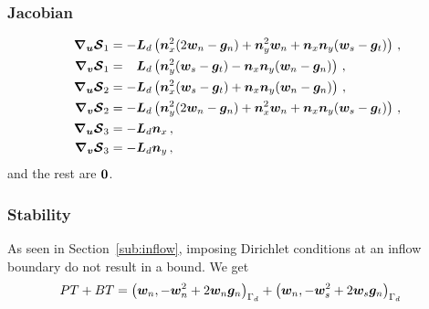 \subsubsection*{Jacobian}
  \begin{equation*}
    \begin{aligned}
      \bm{\nabla}_{\bm{u}} \bm{\mathcal{S}}_1 &= -\bm{L}_d \left(\bm{n}_x^2(2\bm{w}_n - \bm{g}_n) + \bm{n}_y^2\bm{w}_n + \bm{n}_x \bm{n}_y (\bm{w}_s - \bm{g}_t)\right)\,, \\
      \bm{\nabla}_{\bm{v}} \bm{\mathcal{S}}_1 &= \phantom{-}\bm{L}_d \left(\bm{n}_y^2(\bm{w}_s - \bm{g}_t) - \bm{n}_x\bm{n}_y(\bm{w}_n - \bm{g}_n)\right)\,, \\
      \bm{\nabla}_{\bm{u}} \bm{\mathcal{S}}_2 &= -\bm{L}_d \left(\bm{n}_x^2(\bm{w}_s - \bm{g}_t) + \bm{n}_x\bm{n}_y(\bm{w}_n - \bm{g}_n)\right)\,, \\
      \bm{\nabla}_{\bm{v}} \bm{\mathcal{S}}_2 &= -\bm{L}_d \left(\bm{n}_y^2(2\bm{w}_n - \bm{g}_n) + \bm{n}_x^2\bm{w}_n + \bm{n}_x \bm{n}_y (\bm{w}_s - \bm{g}_t)\right) \,, \\
      \bm{\nabla}_{\bm{u}} \bm{\mathcal{S}}_3 &= -\bm{L}_d \bm{n}_x \,, \\
      \bm{\nabla}_{\bm{v}} \bm{\mathcal{S}}_3 &= -\bm{L}_d \bm{n}_y \,,
    \end{aligned}
  \end{equation*}
  and the rest are $\bm{0}$.

\subsubsection*{Stability}
As seen in Section~\ref{sub:inflow}, imposing Dirichlet conditions at an inflow boundary do not result in a bound. We get 
\begin{align*}
  PT + BT & = 
  \left(\bm{w}_n, -\bm{w}_n^2 + 2 \bm{w}_n \bm{g}_n\right)_{\Gamma_d} + \left(\bm{w}_n, -\bm{w}_s^2 + 2 \bm{w}_s \bm{g}_n\right)_{\Gamma_d}
\end{align*}
